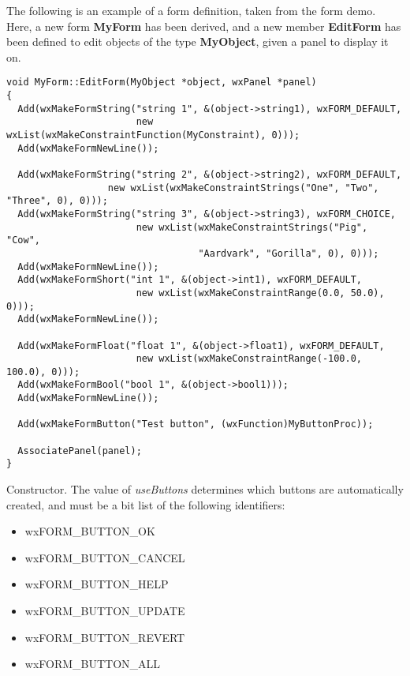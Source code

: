 The following is an example of a form definition, taken from the form demo.
Here, a new form {\bf MyForm} has been derived, and a new member {\bf
EditForm} has been defined to edit objects of the type {\bf MyObject},
given a panel to display it on.

\begin{verbatim}
void MyForm::EditForm(MyObject *object, wxPanel *panel)
{
  Add(wxMakeFormString("string 1", &(object->string1), wxFORM_DEFAULT,
                       new wxList(wxMakeConstraintFunction(MyConstraint), 0)));
  Add(wxMakeFormNewLine());

  Add(wxMakeFormString("string 2", &(object->string2), wxFORM_DEFAULT,
                  new wxList(wxMakeConstraintStrings("One", "Two", "Three", 0), 0)));
  Add(wxMakeFormString("string 3", &(object->string3), wxFORM_CHOICE,
                       new wxList(wxMakeConstraintStrings("Pig", "Cow",
                                  "Aardvark", "Gorilla", 0), 0)));
  Add(wxMakeFormNewLine());
  Add(wxMakeFormShort("int 1", &(object->int1), wxFORM_DEFAULT,
                       new wxList(wxMakeConstraintRange(0.0, 50.0), 0)));
  Add(wxMakeFormNewLine());

  Add(wxMakeFormFloat("float 1", &(object->float1), wxFORM_DEFAULT,
                       new wxList(wxMakeConstraintRange(-100.0, 100.0), 0)));
  Add(wxMakeFormBool("bool 1", &(object->bool1)));
  Add(wxMakeFormNewLine());

  Add(wxMakeFormButton("Test button", (wxFunction)MyButtonProc));

  AssociatePanel(panel);
}
\end{verbatim}



Constructor. The value of {\it useButtons} determines which buttons are
automatically created, and must be a bit list of the following
identifiers:

\begin{itemize}\itemsep=0pt
\item wxFORM\_BUTTON\_OK
\item wxFORM\_BUTTON\_CANCEL
\item wxFORM\_BUTTON\_HELP
\item wxFORM\_BUTTON\_UPDATE
\item wxFORM\_BUTTON\_REVERT
\item wxFORM\_BUTTON\_ALL
\end{itemize}

